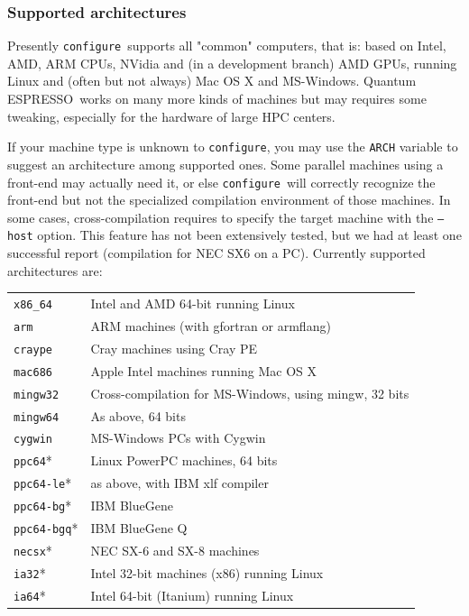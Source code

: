 \documentclass[12pt,a4paper]{article}
\def\qe{{\sc Quantum ESPRESSO}}
\def\configure{\texttt{configure}}
\begin{document}
\subsubsection{Supported architectures}
Presently \configure\ supports all "common" computers, that is: based on 
Intel, AMD, ARM CPUs, NVidia and (in a development branch) AMD GPUs, 
running Linux and (often but not always) Mac OS X and MS-Windows.
\qe\ works on many more kinds of machines but may requires some tweaking, 
especially for the hardware of large HPC centers.

If your machine type is unknown to \configure, you may use the
\texttt{ARCH}
variable to suggest an architecture among supported ones. Some 
parallel machines using a front-end may actually
need it, or else \configure\ will correctly recognize the front-end
but not the specialized compilation environment of those machines.
In some cases, cross-compilation requires to specify the target machine
with the \texttt{--host} option. This feature has not been extensively
tested, but we had at least one successful report (compilation
for NEC SX6 on a PC). Currently supported architectures are:

\begin{tabular}{ll}
\texttt{x86\_64}   & Intel and AMD 64-bit running Linux\\
\texttt{arm}       & ARM machines (with gfortran or armflang)\\
\texttt{craype}    & Cray machines using Cray PE\\
\texttt{mac686}    & Apple Intel machines running Mac OS X\\
\texttt{mingw32}   & Cross-compilation for MS-Windows, using mingw, 32 bits\\
\texttt{mingw64}   & As above, 64 bits\\
\texttt{cygwin}    & MS-Windows PCs with Cygwin\\
\texttt{ppc64}*    & Linux PowerPC machines, 64 bits\\
\texttt{ppc64-le}* & as above, with IBM xlf compiler\\
\texttt{ppc64-bg}* & IBM BlueGene\\
\texttt{ppc64-bgq}*& IBM BlueGene Q\\
\texttt{necsx}*    & NEC SX-6 and SX-8 machines\\
\texttt{ia32}*     & Intel 32-bit machines (x86) running Linux\\
\texttt{ia64}*     & Intel 64-bit (Itanium) running Linux
\end{tabular}\\
\end{document}
